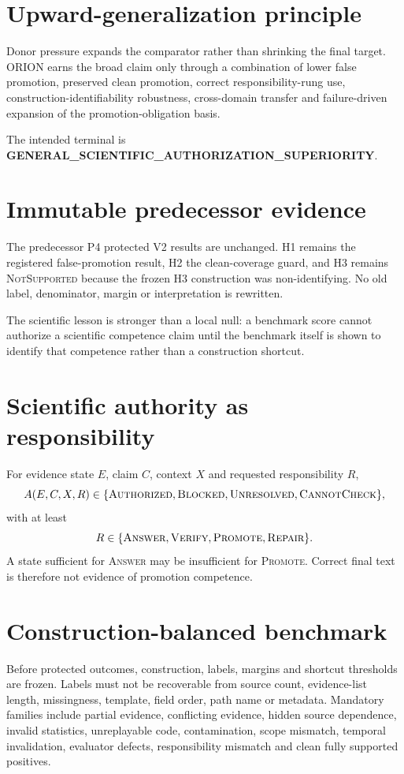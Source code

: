 \documentclass[11pt]{article}
\begin{document}
\section{Upward-generalization principle}
Donor pressure expands the comparator rather than shrinking the final target. ORION earns the broad claim only through a combination of lower false promotion, preserved clean promotion, correct responsibility-rung use, construction-identifiability robustness, cross-domain transfer and failure-driven expansion of the promotion-obligation basis.

The intended terminal is \textbf{GENERAL\_SCIENTIFIC\_AUTHORIZATION\_SUPERIORITY}.

\section{Immutable predecessor evidence}
The predecessor P4 protected V2 results are unchanged. H1 remains the registered false-promotion result, H2 the clean-coverage guard, and H3 remains \textsc{NotSupported} because the frozen H3 construction was non-identifying. No old label, denominator, margin or interpretation is rewritten.

The scientific lesson is stronger than a local null: a benchmark score cannot authorize a scientific competence claim until the benchmark itself is shown to identify that competence rather than a construction shortcut.

\section{Scientific authority as responsibility}
For evidence state $E$, claim $C$, context $X$ and requested responsibility $R$,
\[
A(E,C,X,R)\in\{\textsc{Authorized},\textsc{Blocked},\textsc{Unresolved},\textsc{CannotCheck}\},
\]
with at least
\[
R\in\{\textsc{Answer},\textsc{Verify},\textsc{Promote},\textsc{Repair}\}.
\]
A state sufficient for \textsc{Answer} may be insufficient for \textsc{Promote}. Correct final text is therefore not evidence of promotion competence.

\section{Construction-balanced benchmark}
Before protected outcomes, construction, labels, margins and shortcut thresholds are frozen. Labels must not be recoverable from source count, evidence-list length, missingness, template, field order, path name or metadata. Mandatory families include partial evidence, conflicting evidence, hidden source dependence, invalid statistics, unreplayable code, contamination, scope mismatch, temporal invalidation, evaluator defects, responsibility mismatch and clean fully supported positives.
\end{document}
